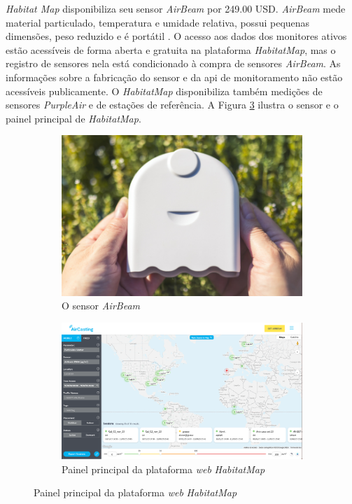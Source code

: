 \textit{Habitat Map} disponibiliza seu sensor \textit{AirBeam} por 249.00 USD. \textit{AirBeam} mede material particulado, temperatura e umidade relativa, possui pequenas dimensões, peso reduzido e é portátil \cite{HabitatMap2023AirCasting}. O acesso aos dados dos monitores ativos estão acessíveis de forma aberta e gratuita na plataforma \textit{HabitatMap}, mas o registro de sensores nela está condicionado à compra de sensores \textit{AirBeam}. As informações sobre a fabricação do sensor e da \acrshort{api} de monitoramento não estão acessíveis publicamente. O \textit{HabitatMap} disponibiliza também medições de sensores \textit{PurpleAir} e de estações de referência. A Figura \ref{fig:habitat-map-initiative} ilustra o sensor e o painel principal de \textit{HabitatMap}.

\begin{figure}[h]
    \centering
    \caption{A iniciativa \textit{Habitat Map} e o sensor \textit{AirBeam}}
    \begin{subfigure}{0.44\textwidth}
        \includegraphics[width=\textwidth]{chapters/1-MONITORAMENTO/Figuras/airbeam-buy-it-now.jpg}
        \caption{O sensor \textit{AirBeam}}
        \label{fig:air-beam}
    \end{subfigure}
    \hfill
    \begin{subfigure}{0.54\textwidth}
        \includegraphics[width=\textwidth]{chapters/1-MONITORAMENTO/Figuras/Habitat Map.png}
        \caption{Painel principal da plataforma \textit{web} \textit{HabitatMap}}
        \label{fig:habitat-map}
    \end{subfigure}
    \hfill
    \label{fig:habitat-map-initiative}
\end{figure}

